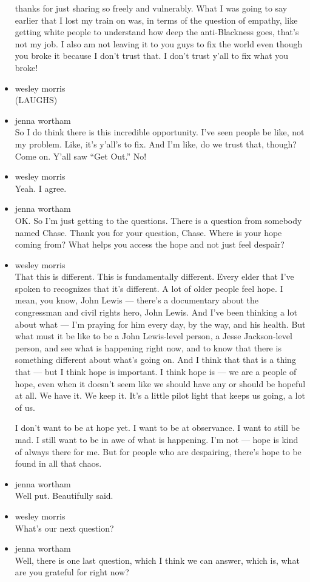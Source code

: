 \begin{itemize}
  thanks for just sharing so freely and vulnerably. What I was going to
  say earlier that I lost my train on was, in terms of the question of
  empathy, like getting white people to understand how deep the
  anti-Blackness goes, that's not my job. I also am not leaving it to
  you guys to fix the world even though you broke it because I don't
  trust that. I don't trust y'all to fix what you broke!
\item
  wesley morris\\
  (LAUGHS)
\item
  jenna wortham\\
  So I do think there is this incredible opportunity. I've seen people
  be like, not my problem. Like, it's y'all's to fix. And I'm like, do
  we trust that, though? Come on. Y'all saw ``Get Out.'' No!
\item
  wesley morris\\
  Yeah. I agree.
\item
  jenna wortham\\
  OK. So I'm just getting to the questions. There is a question from
  somebody named Chase. Thank you for your question, Chase. Where is
  your hope coming from? What helps you access the hope and not just
  feel despair?
\item
  wesley morris\\
  That this is different. This is fundamentally different. Every elder
  that I've spoken to recognizes that it's different. A lot of older
  people feel hope. I mean, you know, John Lewis --- there's a
  documentary about the congressman and civil rights hero, John Lewis.
  And I've been thinking a lot about what --- I'm praying for him every
  day, by the way, and his health. But what must it be like to be a John
  Lewis-level person, a Jesse Jackson-level person, and see what is
  happening right now, and to know that there is something different
  about what's going on. And I think that that is a thing that --- but I
  think hope is important. I think hope is --- we are a people of hope,
  even when it doesn't seem like we should have any or should be hopeful
  at all. We have it. We keep it. It's a little pilot light that keeps
  us going, a lot of us.

  I don't want to be at hope yet. I want to be at observance. I want to
  still be mad. I still want to be in awe of what is happening. I'm not
  --- hope is kind of always there for me. But for people who are
  despairing, there's hope to be found in all that chaos.
\item
  jenna wortham\\
  Well put. Beautifully said.
\item
  wesley morris\\
  What's our next question?
\item
  jenna wortham\\
  Well, there is one last question, which I think we can answer, which
  is, what are you grateful for right now?


\end{itemize}
